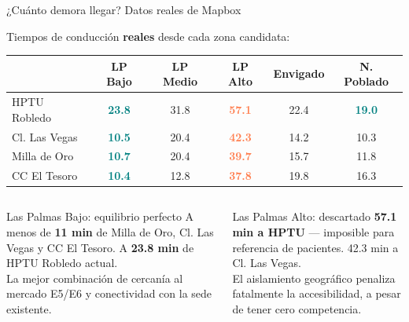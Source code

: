 \documentclass[aspectratio=169, 11pt]{beamer}
\newcommand{\highlight}[1]{\textcolor{teal}{\textbf{#1}}}
\newcommand{\danger}[1]{\textcolor{coral}{\textbf{#1}}}
\newcommand{\src}[1]{\par\vspace{2pt}{\tiny\textcolor{slate}{Fuente: #1}}}
\begin{document}
\begin{frame}{¿Cuánto demora llegar? Datos reales de Mapbox}

Tiempos de conducción \textbf{reales} desde cada zona candidata:

\vspace{8pt}
\begin{center}
{\small
\begin{tabular}{@{}l*{5}{c}@{}}
\toprule
 & \cellcolor{teal!10}\textbf{LP Bajo} & \textbf{LP Medio} & \textbf{LP Alto} & \textbf{Envigado} & \textbf{N. Poblado} \\
\midrule
HPTU Robledo & \cellcolor{teal!10}\highlight{23.8} & 31.8 & \danger{57.1} & 22.4 & \highlight{19.0} \\
Cl. Las Vegas & \cellcolor{teal!10}\highlight{10.5} & 20.4 & \danger{42.3} & 14.2 & 10.3 \\
Milla de Oro & \cellcolor{teal!10}\highlight{10.7} & 20.4 & \danger{39.7} & 15.7 & 11.8 \\
CC El Tesoro & \cellcolor{teal!10}\highlight{10.4} & 12.8 & \danger{37.8} & 19.8 & 16.3 \\
\bottomrule
\end{tabular}
}
\end{center}

\vspace{6pt}
\src{Mapbox Directions Matrix API v1 — tiempos en minutos, tráfico real}

\vspace{10pt}
\begin{columns}[T]
\begin{exampleblock}{\small Las Palmas Bajo: equilibrio perfecto}
\small A menos de \textbf{11 min} de Milla de Oro, Cl. Las Vegas y CC El Tesoro.
A \textbf{23.8 min} de HPTU Robledo actual.\\[4pt]
La mejor combinación de cercanía al mercado E5/E6 y conectividad con la sede existente.
\end{exampleblock}

\begin{alertblock}{\small Las Palmas Alto: descartado}
\small \textbf{57.1 min a HPTU} — imposible para referencia de pacientes.
42.3 min a Cl. Las Vegas.\\[4pt]
El aislamiento geográfico penaliza fatalmente la accesibilidad, a pesar de tener cero competencia.
\end{alertblock}
\end{columns}
\end{frame}
\end{document}
